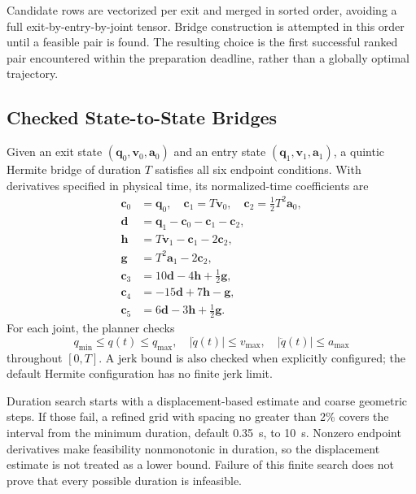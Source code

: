 \documentclass[conference]{IEEEtran}
\newcommand{\vect}[1]{\boldsymbol{#1}}
\begin{document}
Candidate rows are vectorized per exit and merged in sorted order, avoiding a
full exit-by-entry-by-joint tensor. Bridge construction is attempted in this
order until a feasible pair is found. The resulting choice is the first
successful ranked pair encountered within the preparation deadline, rather
than a globally optimal trajectory.

\subsection{Checked State-to-State Bridges}
\label{sec:bridges}
Given an exit state $(\vect{q}_0,\vect{v}_0,\vect{a}_0)$ and an entry state
$(\vect{q}_1,\vect{v}_1,\vect{a}_1)$, a quintic Hermite bridge of duration $T$
satisfies all six endpoint conditions. With derivatives specified in physical
time, its normalized-time coefficients are
\begin{align}
\vect{c}_0&=\vect{q}_0,\quad
\vect{c}_1=T\vect{v}_0,\quad
\vect{c}_2=\tfrac12T^2\vect{a}_0,\nonumber\\
\vect{d}&=\vect{q}_1-\vect{c}_0-\vect{c}_1-\vect{c}_2,\nonumber\\
\vect{h}&=T\vect{v}_1-\vect{c}_1-2\vect{c}_2,\nonumber\\
\vect{g}&=T^2\vect{a}_1-2\vect{c}_2,\nonumber\\
\vect{c}_3&=10\vect{d}-4\vect{h}+\tfrac12\vect{g},\nonumber\\
\vect{c}_4&=-15\vect{d}+7\vect{h}-\vect{g},\nonumber\\
\vect{c}_5&=6\vect{d}-3\vect{h}+\tfrac12\vect{g}.
\label{eq:hermite}
\end{align}
For each joint, the planner checks
\begin{equation}
q_{\min}\leq q(t)\leq q_{\max},\quad
|\dot q(t)|\leq v_{\max},\quad |\ddot q(t)|\leq a_{\max}
\label{eq:limits}
\end{equation}
throughout $[0,T]$. A jerk bound is also checked when explicitly configured;
the default Hermite configuration has no finite jerk limit.

Duration search starts with a displacement-based estimate and coarse
geometric steps. If those fail, a refined grid with spacing no greater than
2\% covers the interval from the minimum duration, default 0.35~s, to 10~s.
Nonzero endpoint derivatives make feasibility nonmonotonic in duration, so
the displacement estimate is not treated as a lower bound. Failure of this
finite search does not prove that every possible duration is infeasible.
\end{document}
